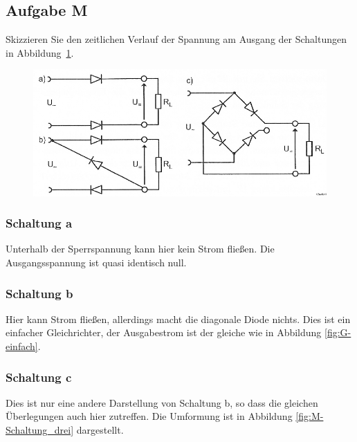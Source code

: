\FloatBarrier
\subsection{Aufgabe M}

\begin{problem}
	Skizzieren Sie den zeitlichen Verlauf der Spannung am Ausgang der
	Schaltungen in Abbildung~\ref{fig:2-9}.
\end{problem}

\begin{figure}[htbp]
	\centering
	\caption{%
		\cite[Abbildung~2.9]{physik313-Anleitung}
	}
	\label{fig:2-9}
	\includegraphics[width=\linewidth]{Bilder_aus_Anleitung/2-9.png}
\end{figure}

\subsubsection{Schaltung a}

Unterhalb der Sperrspannung kann hier kein Strom fließen. Die Ausgangsspannung
ist quasi identisch null.

\subsubsection{Schaltung b}

Hier kann Strom fließen, allerdings macht die diagonale Diode nichts. Dies ist
ein einfacher Gleichrichter, der Ausgabestrom ist der gleiche wie in Abbildung
\ref{fig:G-einfach}.

\subsubsection{Schaltung c}

Dies ist nur eine andere Darstellung von Schaltung b, so dass die gleichen
Überlegungen auch hier zutreffen. Die Umformung ist in Abbildung
\ref{fig:M-Schaltung_drei} dargestellt.

